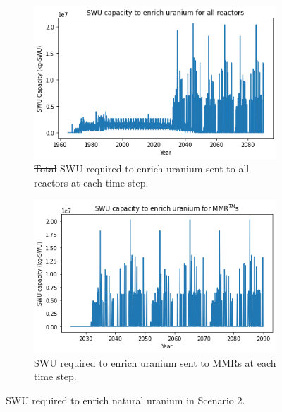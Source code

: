 \documentclass[preprint]{elsarticle}
\providecommand{\DIFdeltex}[1]{{\protect\color{red}\sout{#1}}}                      %
\providecommand{\DIFdelFL}[1]{\DIFdel{#1}} %
\providecommand{\DIFaddbeginFL}{} %
\providecommand{\DIFaddendFL}{} %
\providecommand{\DIFdelbeginFL}{} %
\providecommand{\DIFdelendFL}{} %
\providecommand{\DIFdel}[1]{\texorpdfstring{\DIFdeltex{#1}}{}} %
\begin{document}
\begin{figure}
    \centering
    \DIFdelbeginFL %
\DIFdelendFL \DIFaddbeginFL \begin{subfigure}{0.45\textwidth}
        \DIFaddendFL \centering
        \DIFdelbeginFL %
\DIFdelendFL \DIFaddbeginFL \includegraphics[scale=0.4]{../figures/totalswu_scenarios_2.png}
        \DIFaddendFL \caption{\DIFdelbeginFL \DIFdelFL{Total }\DIFdelendFL \gls{SWU} required to enrich uranium sent to all reactors at each time step.}
        \label{fig:totalswu_2}
    \end{subfigure}
    \hspace{0.8cm}
    \DIFdelbeginFL %
\DIFdelendFL \DIFaddbeginFL \begin{subfigure}{0.45\textwidth}
        \DIFaddendFL \centering
        \DIFdelbeginFL %
\DIFdelendFL \DIFaddbeginFL \includegraphics[scale=0.4]{../figures/haleuSWU_scenarios_2.png}
        \DIFaddendFL \caption{\gls{SWU} required to enrich uranium sent to \glspl{MMR} at each time step.}
        \label{fig:haleuswu_2}
    \end{subfigure}
    \caption{\gls{SWU} required to enrich natural uranium in Scenario 2.}
    \label{fig:swu_2}
\end{figure}
\end{document}
